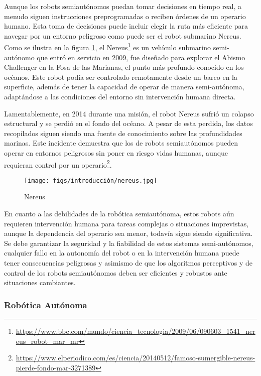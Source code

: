 Aunque los robots semiautónomos puedan tomar decisiones en tiempo real, a menudo siguen instrucciones preprogramadas o reciben órdenes de un operario humano. Esta toma de decisiones
puede incluir elegir la ruta más eficiente para navegar por un entorno peligroso como puede ser el robot submarino Nereus. Como se ilustra en la figura \ref{fig:Nereus}, 
el Nereus\footnote{\url{https://www.bbc.com/mundo/ciencia_tecnologia/2009/06/090603_1541_nereus_robot_mar_mr}} 
es un vehículo submarino semi-autónomo que entró en servicio en 2009, fue diseñado para explorar el Abismo Challenger en la Fosa de las Marianas, el punto más profundo conocido en los 
océanos. Este robot podía ser controlado remotamente desde un barco en la superficie, además de tener la capacidad de operar de manera semi-autónoma, adaptándose a las condiciones del entorno
sin intervención humana directa.

Lamentablemente, en 2014 durante una misión, el robot Nereus sufrió un colapso estructural y se perdió en el fondo del océano. A pesar de esta perdida, los datos recopilados
siguen siendo una fuente de conocimiento sobre las profundidades marinas. Este incidente demuestra que los de robots semiautónomos pueden operar en entornos peligrosos sin poner 
en riesgo vidas humanas, aunque requieran control por un operario\footnote{\url{https://www.elperiodico.com/es/ciencia/20140512/famoso-sumergible-nereus-pierde-fondo-mar-3271389}}. 

\begin{figure} [H]
  \begin{center}
    \texttt{[image: figs/introducción/nereus.jpg]}
  \end{center}
  \caption{Nereus}
  \label{fig:Nereus}
  \vspace{-1.5em}
\end{figure}

En cuanto a las debilidades de la robótica semiautónoma, estos robots 
aún requieren intervención humana para tareas complejas o situaciones imprevistas, aunque la dependencia del operario sea menor, todavía sigue siendo significativa. 
Se debe garantizar la seguridad y la fiabilidad de estos sistemas semi-autónomos, cualquier fallo en la autonomía del robot 
o en la intervención humana puede tener consecuencias peligrosas y asimismo de que los algoritmos perceptivos y de control de los robots semiautónomos deben ser eficientes y 
robustos ante situaciones cambiantes.

\subsubsection{Robótica Autónoma}
\label{sec:subseccion}


